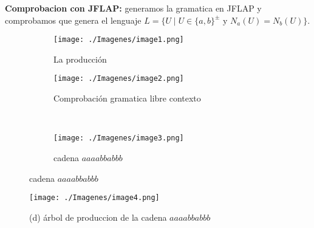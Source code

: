 \documentclass{article}
\begin{document}
           
            \newpage
            \textbf{Comprobacion con JFLAP: }
            generamos la gramatica en JFLAP y comprobamos que genera el lenguaje $L = \{ U \mid U \in \{a, b\}^{\pm} \text{ y } N_a(U) = N_b(U) \}$.
            \begin{figure}[h] 
            \centering
                \centering
                \begin{subfigure}[b]{0.35\textwidth}
                    \centering
                    \texttt{[image: ./Imagenes/image1.png]}
                    \caption{La producción}
                    \label{fig:label1}
                \end{subfigure}
                \hfill
                \begin{subfigure}[b]{0.55\textwidth}
                    \centering
                    \texttt{[image: ./Imagenes/image2.png]}
                    \caption{Comprobación gramatica libre contexto}
                    \label{fig:label2}
                \end{subfigure}
                \vspace{0.5cm} 
                \\
                \begin{subfigure}[b]{0.35\textwidth}
                    \centering
                    \texttt{[image: ./Imagenes/image3.png]}
                    \caption{cadena $aaaabbabbb$}
                    \label{fig:label3}
                \end{subfigure}
                \label{fig:matrix1}
            \end{figure}

            \begin{figure}[!h]
                \centering
                \texttt{[image: ./Imagenes/image4.png]}
                \caption*{(d) árbol de produccion de la cadena $aaaabbabbb$}
                \label{fig:label4}
            \end{figure}
                
        \newpage

\end{document}
